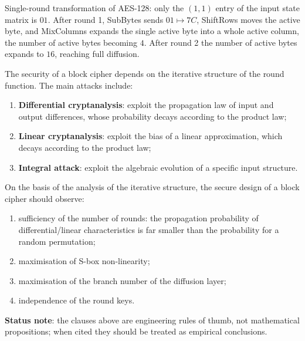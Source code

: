 \begin{example}\label{ex:aes_diffusion}
Single-round transformation of AES-128: only the \((1,1)\) entry of the input state matrix is \(01\). After round 1, SubBytes sends \(01\mapsto7C\), ShiftRows moves the active byte, and MixColumns expands the single active byte into a whole active column, the number of active bytes becoming \(4\). After round 2 the number of active bytes expands to \(16\), reaching full diffusion.
\end{example}

\begin{definition}\label{def:block_cipher_period_attack}
The security of a block cipher depends on the iterative structure of the round function. The main attacks include:
\begin{enumerate}[label=(\roman*)]
    \item \textbf{Differential cryptanalysis}: exploit the propagation law of input and output differences, whose probability decays according to the product law;
    \item \textbf{Linear cryptanalysis}: exploit the bias of a linear approximation, which decays according to the product law;
    \item \textbf{Integral attack}: exploit the algebraic evolution of a specific input structure.
\end{enumerate}
\end{definition}

\begin{remark}\label{prop:block_cipher_security}
On the basis of the analysis of the iterative structure, the secure design of a block cipher should observe:
\begin{enumerate}[label=(\roman*)]
    \item sufficiency of the number of rounds: the propagation probability of differential/linear characteristics is far smaller than the probability for a random permutation;
    \item maximisation of S-box non-linearity;
    \item maximisation of the branch number of the diffusion layer;
    \item independence of the round keys.
\end{enumerate}
\textbf{Status note}: the clauses above are engineering rules of thumb, not mathematical propositions; when cited they should be treated as empirical conclusions.
\end{remark}

